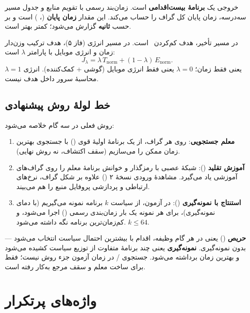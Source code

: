 \documentclass[11pt,a4paper]{article}
\newcommand{\T}{\lr{T}}
\begin{document}
خروجی یک \textbf{برنامهٔ بیست‌اقدامی} است.
زمان‌بند رسمی با تقویم منابع و جدول مسیر سه‌درسه، زمان پایان کل گراف را حساب می‌کند.
این مقدار \textbf{زمان پایان} (\T، ) است و بر حسب \textbf{ثانیه} گزارش می‌شود؛ کمتر بهتر است.

در مسیر تأخیر، هدف کم‌کردن \T\ است.
در مسیر انرژی (فاز ۵)، هدف ترکیب وزن‌دار زمان و انرژی موبایل با پارامتر $\lambda$ است:
\[
J_\lambda = \lambda\, T_{\mathrm{norm}} + (1-\lambda)\, E_{\mathrm{norm}}.
\]
$\lambda{=}1$ یعنی فقط زمان؛ $\lambda{=}0$ یعنی فقط انرژی موبایل (گوشی + کمک‌کننده).
انرژی محاسبهٔ سرور  داخل هدف نیست.

\subsection{خط لولهٔ روش پیشنهادی}

روش فعلی در سه گام خلاصه می‌شود:

\begin{enumerate}
  \item \textbf{معلم جستجویی}: روی هر گراف، از یک برنامهٔ اولیهٔ قوی ()
        با جستجوی  بهترین زمان ممکن را می‌سازیم (سقف اکتشاف، نه روش نهایی).
  \item \textbf{آموزش تقلید} (): شبکهٔ عصبی با رمزگذار  و خوانش 
        برنامهٔ معلم را روی گراف‌های آموزشی یاد می‌گیرد.
        مشاهدهٔ ورودی نسخهٔ ۲ () علاوه بر شکل گراف، نرخ‌های ارتباطی و پردازشی پروفایل منبع را هم می‌بیند.
  \item \textbf{استنتاج با نمونه‌گیری} (): در آزمون، از سیاست $k$ برنامه نمونه می‌گیریم
        (با دمای نمونه‌گیری)، برای هر نمونه یک بار زمان‌بندی رسمی () اجرا می‌شود،
        و کم‌زمان‌ترین برنامه نگه داشته می‌شود. $k\le 64$.
\end{enumerate}

\begin{notebox}
\textbf{حریص} () یعنی در هر گام وظیفه، اقدام با بیشترین احتمال سیاست انتخاب می‌شود — بدون نمونه‌گیری.
\textbf{نمونه‌گیری} یعنی چند برنامهٔ متفاوت از توزیع سیاست کشیده می‌شود و بهترین زمان برداشته می‌شود.
جستجوی / در زمان آزمون جزء روش نیست؛ فقط برای ساخت معلم و سقف مرجع به‌کار رفته است.
\end{notebox}

\section{واژه‌های پرتکرار}
\label{sec:glossary}
\end{document}
